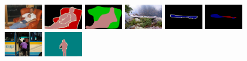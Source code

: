 \begin{figure}[h]
	\centering
	\quad
	\\
	\includegraphics[width=0.15\textwidth]{demo_images/result/error/2008_000673.jpg}
	\includegraphics[width=0.15\textwidth]{demo_images/result/error/2008_000673.png}
	\includegraphics[width=0.15\textwidth]{demo_images/result/error/p_2008_000673.png} 
	\quad
	\includegraphics[width=0.15\textwidth]{demo_images/result/error/2008_001580.jpg} 
	\includegraphics[width=0.15\textwidth]{demo_images/result/error/2008_001580.png}
	\includegraphics[width=0.15\textwidth]{demo_images/result/error/p_2008_001580.png} 
	\\
	\includegraphics[width=0.15\textwidth]{demo_images/result/error/2007_002539.jpg}
	\includegraphics[width=0.15\textwidth]{demo_images/result/error/2007_002539.png}

\end{figure}
